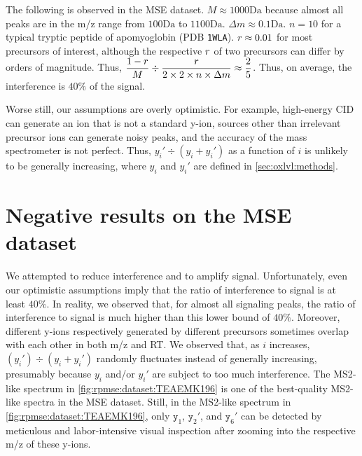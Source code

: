 The following is observed in the \gls{MSE} dataset. 
\(M\approx1000\si{\dalton}\) because almost all peaks are in the \gls{m/z} range from \(100\si{\dalton}\) to \(1100\si{\dalton}\). 
\(\Delta m\approx0.1\si{\dalton}\). %
\(n=10\) for a typical tryptic peptide of apomyoglobin (\gls{PDB} \texttt{1WLA}).
\(\mathnormal{r}\approx0.01\) for most precursors of interest,
	although the respective \(\mathnormal{r}\) of two precursors can differ by orders of magnitude.
Thus, 
	\(\displaystyle
		\frac{1-\mathnormal{r}}{M} %
		\div
	  \frac{\mathnormal{r}}{2 \times 2 \times n  \times \Delta{}m} %
		\approx \frac{2}{5}\).	
Thus, on average, the interference is \(40\%\) of the signal.
 
Worse still, our assumptions are overly optimistic. 
For example,
	high-energy \gls{CID} can generate an ion that is not a standard y-ion,
	sources other than irrelevant precursor ions can generate noisy peaks,
	and the accuracy of the mass spectrometer is not perfect.
Thus, 
	\(y_i'\div(y_i+y_i')\) as a function of \(i\) is unlikely to be generally increasing,
	where \(y_i\) and \(y_i'\) are defined in \cref{sec:oxlvl:methods}.
 	 	
\section{Negative results on the \texorpdfstring{\gls{MSE}}{MSE} dataset}	

We attempted to reduce interference and to amplify signal.
Unfortunately, even our optimistic assumptions imply that the ratio of interference to signal is at least \(40\%\).
In reality, we observed that, for almost all signaling peaks, the ratio of interference to signal is much higher than this lower bound of \(40\%\). 
Moreover, different y-ions respectively generated by different precursors sometimes overlap with each other in both \gls{m/z} and \gls{RT}.
We observed that, as \(i\) increases, \((y_i')\div(y_i+y_i')\) randomly fluctuates instead of generally increasing,
	presumably because \(y_i\) and/or \(y_i'\) are subject to too much interference.
The \gls{MS2}-like spectrum in \cref{fig:rpmse:dataset:TEAEMK196} is one of the best-quality \gls{MS2}-like spectra in the \gls{MSE} dataset.
Still, in the \gls{MS2}-like spectrum in \cref{fig:rpmse:dataset:TEAEMK196}, only \(\texttt{y}_1\),  \(\texttt{y}_2'\), and \(\texttt{y}_6'\) 
		can be detected by meticulous and labor-intensive visual inspection after zooming into the respective \gls{m/z} of these y-ions.

